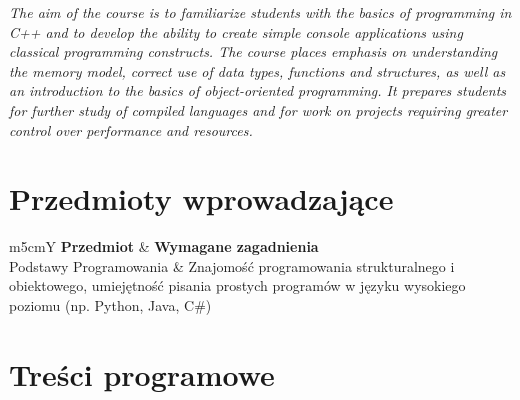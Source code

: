 \documentclass[12pt, a4paper]{article}
\newcommand{\thdrule}{\noalign{\global\setlength{\extrarowheight}{0pt}}}
\newcommand{\thdend}{\noalign{\global\setlength{\extrarowheight}{3pt}}}
\begin{document}
\textit{The aim of the course is to familiarize students with the basics of programming in C++ and to develop the ability to create simple console applications using classical programming constructs. The course places emphasis on understanding the memory model, correct use of data types, functions and structures, as well as an introduction to the basics of object-oriented programming. It prepares students for further study of compiled languages and for work on projects requiring greater control over performance and resources.}


\section{Przedmioty wprowadzające}

{\scriptsize
\begin{tabularx}{\textwidth}{m{5cm}Y}
\thdrule\toprule
{} {\color{white}\textbf{Przedmiot}} & {\color{white}\textbf{Wymagane zagadnienia}} \\
\midrule\thdend
   Podstawy Programowania & Znajomość programowania strukturalnego i obiektowego, umiejętność pisania prostych programów w języku wysokiego poziomu (np. Python, Java, C\#) \\
\bottomrule
\end{tabularx}}

\section{Treści programowe}
\end{document}
